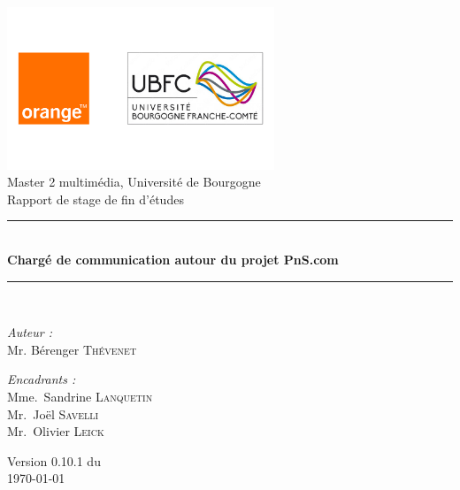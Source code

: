 \documentclass[a4paper,12pt]{book}
\theoremstyle{break}
\begin{document}

\begin{titlepage}
\begin{center}

\includegraphics[width=0.6\textwidth]{entete}\\[1cm]

{\large Master 2 multimédia, Université de Bourgogne}\\[0.5cm]

{\large Rapport de stage de fin d'études}\\[0.5cm]

\rule{\linewidth}{0.5mm} \\[0.4cm]
{ \huge \bfseries Chargé de communication autour du projet PnS.com \\[0.4cm] }
\rule{\linewidth}{0.5mm} \\[1.5cm]

\noindent
\begin{minipage}{0.4\textwidth}
  \begin{flushleft} \large
    \emph{Auteur :}\\
    Mr. Bérenger \textsc{Thévenet}\\
  \end{flushleft}
\end{minipage}%
\begin{minipage}{0.4\textwidth}
  \begin{flushright} \large
    \emph{Encadrants :} \\
    Mme.~Sandrine \textsc{Lanquetin}\\
    Mr.~Joël \textsc{Savelli}\\
    Mr.~Olivier \textsc{Leick}
  \end{flushright}
\end{minipage}

\vfill

{\large Version 0.10.1 du\\ \today}

\end{center}
\end{titlepage}
\end{document}
